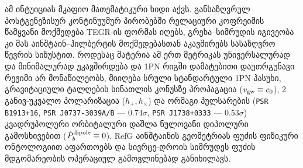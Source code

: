 \documentclass[11pt,a4paper]{article}
\begin{document}
ამ ინტუიციას მკაფიო მათემატიკური ხიდი აქვს. განსაზღვრულ პოსტგენეზისურ კონტინუუმურ პირობებში რელაციური კოფრეიმის წამყვანი მოქმედება TEGR-ის ფორმას იღებს, გრეხა–სიმრუდის იგივეობა კი მას აინშტაინ–ჰილბერტის მოქმედებასთან აკავშირებს სასაზღვრო წევრის სიზუსტით. როდესაც მატერია ამ ერთ მეტრიკას უნივერსალურად და მინიმალურად უკავშირდება და 1PN რიგში დამატებითი დაუთრგუნავი რეჟიმი არ მონაწილეობს, მიიღება სრული სტანდარტული 1PN პასუხი, გრავიტაციული ტალღების სინათლის კონუსზე პროპაგაცია ($v_{\rm gw}\equiv c_0$), 2 განივ-უკვალო პოლარიზაცია ($h_+, h_\times$) და ორმაგი პულსარების (\texttt{PSR B1913+16}, \texttt{PSR J0737-3039A/B} — $0.74\sigma$, \texttt{PSR J1738+0333} — $0.53\sigma$) კვადრუპოლური ორბიტალური დაშლა ნულოვანი დიპოლური გამოსხივებით ($\dot{P}_b^{\rm dipole}\equiv 0$). RefG აინშტაინის გეომეტრიას ფუძის ფიზიკური ონტოლოგიით აფართოებს და სივრცე-დროის სიმრუდეს ფუძის მდგომარეობის ოპერაციულ გამოვლინებად განიხილავს.
\end{document}
